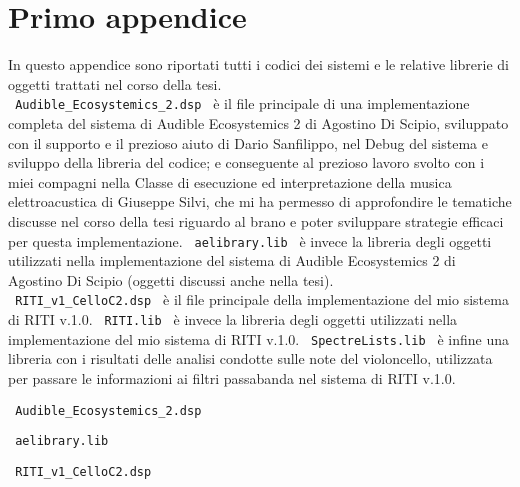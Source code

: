 \section{Primo appendice}

In questo appendice sono riportati tutti i codici dei sistemi
e le relative librerie di oggetti trattati nel corso della tesi. \\
\verb| Audible_Ecosystemics_2.dsp | è il file principale di una implementazione 
completa del sistema di Audible Ecosystemics 2 di Agostino Di Scipio, sviluppato con il supporto
e il prezioso aiuto di Dario Sanfilippo, nel Debug del sistema e sviluppo della libreria del codice; 
e conseguente al prezioso lavoro svolto con i miei compagni nella Classe di esecuzione ed interpretazione 
della musica elettroacustica di Giuseppe Silvi, che mi ha permesso di approfondire le tematiche
discusse nel corso della tesi riguardo al brano e poter sviluppare strategie efficaci per questa implementazione.
\verb| aelibrary.lib | è invece la libreria degli oggetti utilizzati nella implementazione del sistema
di Audible Ecosystemics 2 di Agostino Di Scipio (oggetti discussi anche nella tesi). \\
\verb| RITI_v1_CelloC2.dsp | è il file principale della implementazione 
del mio sistema di RITI v.1.0. \verb| RITI.lib | è invece la libreria degli oggetti utilizzati nella 
implementazione del mio sistema di RITI v.1.0. \verb| SpectreLists.lib | è infine una libreria
con i risultati delle analisi condotte sulle note del violoncello, utilizzata per passare le informazioni
ai filtri passabanda nel sistema di RITI v.1.0. \\
\clearpage


\begin{center} \Large \verb| Audible_Ecosystemics_2.dsp | \normalsize \\
    \vspace{0.2cm} \end{center}

\clearpage

\begin{center} \Large \verb| aelibrary.lib | \normalsize \\
    \vspace{0.2cm} \end{center}

\clearpage

\begin{center} \Large \verb| RITI_v1_CelloC2.dsp | \normalsize \\
    \vspace{0.2cm} \end{center}

\clearpage

